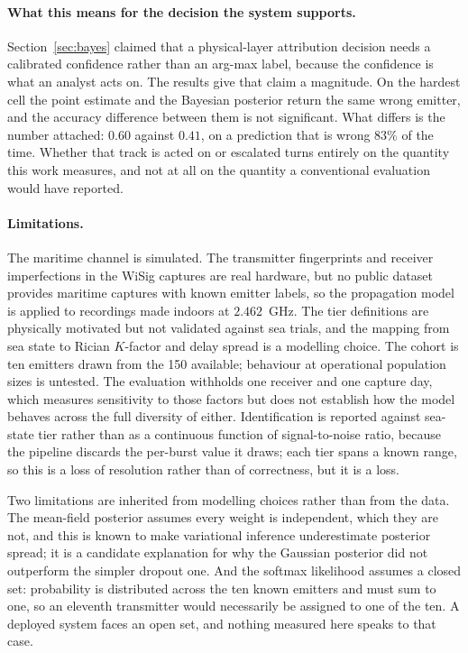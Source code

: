 \documentclass{article}
\begin{document}
\paragraph{What this means for the decision the system supports.}
Section~\ref{sec:bayes} claimed that a physical-layer attribution decision needs
a calibrated confidence rather than an arg-max label, because the confidence is
what an analyst acts on. The results give that claim a magnitude. On the hardest
cell the point estimate and the Bayesian posterior return the same wrong
emitter, and the accuracy difference between them is not significant. What
differs is the number attached: $0.60$ against $0.41$, on a prediction that is
wrong $83\%$ of the time. Whether that track is acted on or escalated turns
entirely on the quantity this work measures, and not at all on the quantity a
conventional evaluation would have reported.

\paragraph{Limitations.}
The maritime channel is simulated. The transmitter fingerprints and receiver
imperfections in the WiSig captures are real hardware, but no public dataset
provides maritime captures with known emitter labels, so the propagation model
is applied to recordings made indoors at $2.462$~GHz. The tier definitions are
physically motivated but not validated against sea trials, and the mapping from
sea state to Rician $K$-factor and delay spread is a modelling choice. The
cohort is ten emitters drawn from the 150 available; behaviour at operational
population sizes is untested. The evaluation withholds one receiver and one
capture day, which measures sensitivity to those factors but does not establish
how the model behaves across the full diversity of either. Identification is
reported against sea-state tier rather than as a continuous function of
signal-to-noise ratio, because the pipeline discards the per-burst value it
draws; each tier spans a known range, so this is a loss of resolution rather
than of correctness, but it is a loss.

Two limitations are inherited from modelling choices rather than from the data.
The mean-field posterior assumes every weight is independent, which they are
not, and this is known to make variational inference underestimate posterior
spread; it is a candidate explanation for why the Gaussian posterior did not
outperform the simpler dropout one. And the softmax likelihood assumes a closed
set: probability is distributed across the ten known emitters and must sum to
one, so an eleventh transmitter would necessarily be assigned to one of the ten.
A deployed system faces an open set, and nothing measured here speaks to that
case.
\end{document}
